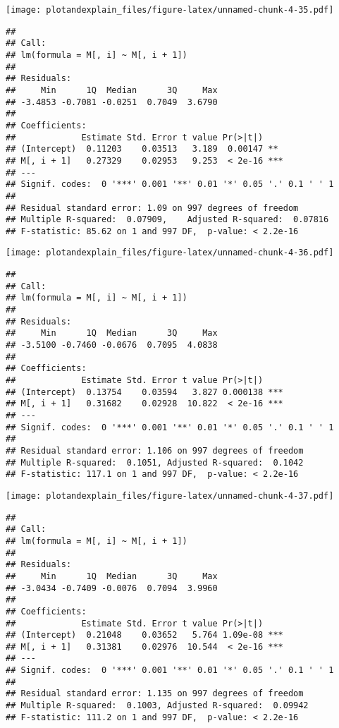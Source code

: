 \documentclass[]{article}
\begin{document}
\texttt{[image: plotandexplain\_files/figure-latex/unnamed-chunk-4-35.pdf]}

\begin{verbatim}
## 
## Call:
## lm(formula = M[, i] ~ M[, i + 1])
## 
## Residuals:
##     Min      1Q  Median      3Q     Max 
## -3.4853 -0.7081 -0.0251  0.7049  3.6790 
## 
## Coefficients:
##             Estimate Std. Error t value Pr(>|t|)    
## (Intercept)  0.11203    0.03513   3.189  0.00147 ** 
## M[, i + 1]   0.27329    0.02953   9.253  < 2e-16 ***
## ---
## Signif. codes:  0 '***' 0.001 '**' 0.01 '*' 0.05 '.' 0.1 ' ' 1
## 
## Residual standard error: 1.09 on 997 degrees of freedom
## Multiple R-squared:  0.07909,    Adjusted R-squared:  0.07816 
## F-statistic: 85.62 on 1 and 997 DF,  p-value: < 2.2e-16
\end{verbatim}

\texttt{[image: plotandexplain\_files/figure-latex/unnamed-chunk-4-36.pdf]}

\begin{verbatim}
## 
## Call:
## lm(formula = M[, i] ~ M[, i + 1])
## 
## Residuals:
##     Min      1Q  Median      3Q     Max 
## -3.5100 -0.7460 -0.0676  0.7095  4.0838 
## 
## Coefficients:
##             Estimate Std. Error t value Pr(>|t|)    
## (Intercept)  0.13754    0.03594   3.827 0.000138 ***
## M[, i + 1]   0.31682    0.02928  10.822  < 2e-16 ***
## ---
## Signif. codes:  0 '***' 0.001 '**' 0.01 '*' 0.05 '.' 0.1 ' ' 1
## 
## Residual standard error: 1.106 on 997 degrees of freedom
## Multiple R-squared:  0.1051, Adjusted R-squared:  0.1042 
## F-statistic: 117.1 on 1 and 997 DF,  p-value: < 2.2e-16
\end{verbatim}

\texttt{[image: plotandexplain\_files/figure-latex/unnamed-chunk-4-37.pdf]}

\begin{verbatim}
## 
## Call:
## lm(formula = M[, i] ~ M[, i + 1])
## 
## Residuals:
##     Min      1Q  Median      3Q     Max 
## -3.0434 -0.7409 -0.0076  0.7094  3.9960 
## 
## Coefficients:
##             Estimate Std. Error t value Pr(>|t|)    
## (Intercept)  0.21048    0.03652   5.764 1.09e-08 ***
## M[, i + 1]   0.31381    0.02976  10.544  < 2e-16 ***
## ---
## Signif. codes:  0 '***' 0.001 '**' 0.01 '*' 0.05 '.' 0.1 ' ' 1
## 
## Residual standard error: 1.135 on 997 degrees of freedom
## Multiple R-squared:  0.1003, Adjusted R-squared:  0.09942 
## F-statistic: 111.2 on 1 and 997 DF,  p-value: < 2.2e-16
\end{verbatim}
\end{document}
